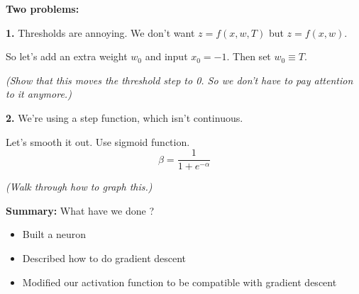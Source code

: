 \textbf{Two problems:}

\textbf{\large 1. } Thresholds are annoying.  We don't want $z = f(x, w, T)$
but $z=f(x, w)$.

So let's add an extra weight $w_0$ and input $x_0=-1$.  Then set $w_0\equiv T$.

\textit{(Show that this moves the threshold step to 0.  So we don't
  have to pay attention to it anymore.)}

\textbf{\large 2. } We're using a step function, which isn't continuous.

Let's smooth it out.  Use sigmoid function.
\begin{displaymath}
  \beta = \frac{1}{1+e^{-\alpha}}
\end{displaymath}

\textit{(Walk through how to graph this.)}

\textbf{Summary: } What have we done ?
\begin{itemize}
\item Built a neuron
\item Described how to do gradient descent
\item Modified our activation function to be compatible with gradient descent
\end{itemize}



